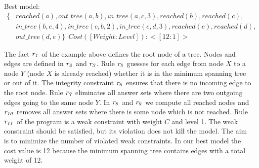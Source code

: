 \documentclass[a4paper, titlepage]{article}
\newcommand{\row}[1]{%
  \ensuremath{\it \color{black} #1 \color{black}}%
}
\begin{document}
Best model:
\begin{align*}
\{ & \mathit{reached(a), out\_tree(a,b), 
   in\_tree(a,c,3), reached(b), reached(c),}\\ 
   & \mathit{in\_tree(b,e,4), in\_tree(c,b,2), in\_tree(c,d,3), 
   reached(e), reached(d),}\\ 
   &\mathit{  out\_tree(d,e)\}} \ \ Cost ([Weight:Level]): <[12:1]>
\end{align*}

The fact $\row{r_1}$ of the example above defines the root node 
of a tree. Nodes and edges are defined in $\row{r_2}$ and $\row{r_3}$. 
Rule $\row{r_5}$ guesses for each edge from node 
$X$ to a node $Y$ (node $X$ is already reached) whether it is in the minimum spanning 
tree or out of it. The integrity constraint $\row{r_6}$ ensures 
that there is no incoming edge to the root node. Rule $\row{r_7}$ 
eliminates all answer sets where there are two outgoing 
edges going to the same node $Y$. In $\row{r_8}$ and $\row{r_9}$ 
we compute all reached nodes and $\row{r_{10}}$ removes all answer sets where there is some node 
which is not reached. Rule $\row{r_{11}}$ of the program is a weak 
constraint with weight $C$ and level 1. The weak constraint 
should be satisfied, but its violation does not kill the 
model. The aim is to minimize the number of violated weak 
constraints. In our best model the cost value is 12 because the minimum spanning tree contains edges with a total weight of 12.  
\end{document}

